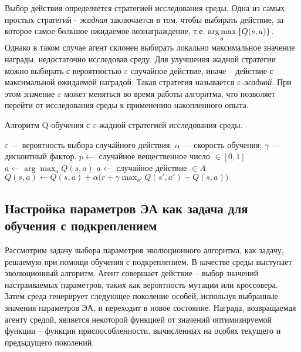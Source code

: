 Выбор действия определяется стратегией исследования среды. Одна из самых простых стратегий - \textit{жадная} заключается в том, чтобы выбирать действие, за которое самое большое ожидаемое вознаграждение, т.е. $\operatorname*{arg\,max}\limits_a{\{Q(s, a)\}}$. Однако в таком случае агент склонен выбирать локально максимальное значение награды, недостаточно исследовав среду. Для улучшения жадной стратегии можно выбирать с вероятностью $\varepsilon$ случайное действие, иначе -- действие с максимальной ожидаемой наградой. Такая стратегия называется $\varepsilon$\textit{-жадной}. При этом значение $\varepsilon$ может меняться во время работы алгоритма, что позволяет перейти от исследования среды к применению накопленного опыта.

\begin{algorithm}[h!]
    \caption{Алгоритм Q-обучения с $\varepsilon$-жадной стратегией исследования среды.}
    \label{q_learning}
    \begin{algorithmic}[1]
    \REQUIRE  
        $\varepsilon$ --- вероятность выбора случайного действия;
        $\alpha$ --- скорость обучения;
        $\gamma$ --- дисконтный фактор.
        \STATE $p \gets ${ случайное вещественное число} $\in [0, 1]$
            \STATE $a \gets \arg \max_{a}{Q(s,a)}$
        \ELSE 
            \STATE $a \gets$ { случайное действие } $\in A$
        \ENDIF
        \STATE $Q(s,a) \gets Q(s,a) + \alpha(r + \gamma \max_{a'}{Q(s',a') - Q(s, a))}$
    \ENDWHILE
    \end{algorithmic}
\end{algorithm}

\subsection{Настройка параметров ЭА как задача для обучения с подкреплением}
Рассмотрим задачу выбора параметров эволюционного алгоритма, как задачу, решаемую при помощи обучения с подкреплением. В качестве среды выступает эволюционный алгоритм. Агент совершает действие -- выбор значений настраиваемых параметров, таких как вероятность мутации или кроссовера. Затем среда генерирует следующее поколение особей, используя выбранные значения параметров ЭА, и переходит в новое состояние. Награда, возвращаемая агенту средой, является некоторой функцией от значений оптимизируемой функции -- функции приспособленности, вычисленных на особях текущего и предыдущего поколений.

